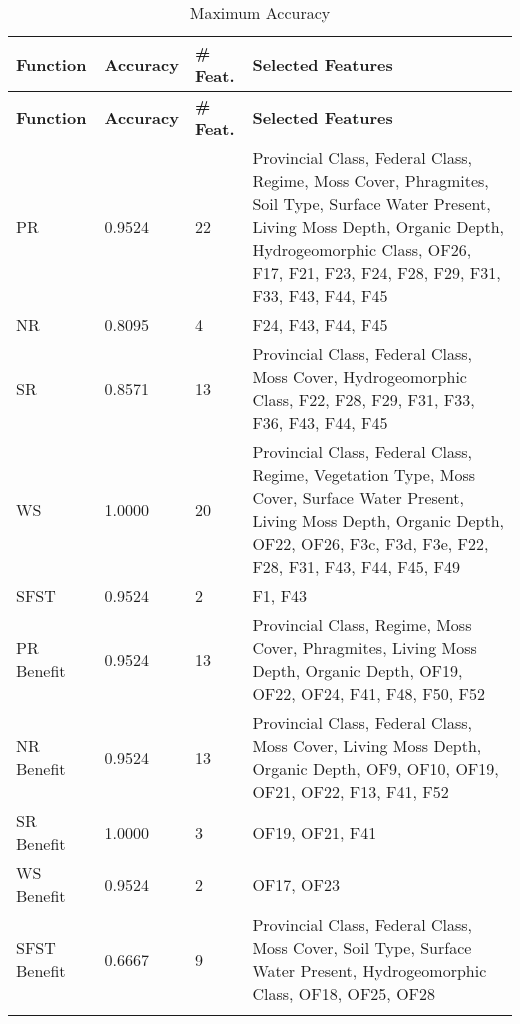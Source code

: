 \begin{longtable}{|p{2cm}|p{2cm}|p{2cm}|p{8cm}|}
\hline
\textbf{Function} & \textbf{Accuracy} & \textbf{\# Feat.} & \textbf{Selected Features} \\ \hline
\endfirsthead
\hline
\textbf{Function} & \textbf{Accuracy} & \textbf{\# Feat.} & \textbf{Selected Features} \\ \hline
\endhead

PR & 0.9524 & 22 & Provincial Class, Federal Class, Regime, Moss Cover, Phragmites, Soil Type, Surface Water Present, Living Moss Depth, Organic Depth, Hydrogeomorphic Class, OF26, F17, F21, F23, F24, F28, F29, F31, F33, F43, F44, F45 \\ \hline
NR & 0.8095 & 4 & F24, F43, F44, F45 \\ \hline
SR & 0.8571 & 13 & Provincial Class, Federal Class, Moss Cover, Hydrogeomorphic Class, F22, F28, F29, F31, F33, F36, F43, F44, F45 \\ \hline
WS & 1.0000 & 20 & Provincial Class, Federal Class, Regime, Vegetation Type, Moss Cover, Surface Water Present, Living Moss Depth, Organic Depth, OF22, OF26, F3c, F3d, F3e, F22, F28, F31, F43, F44, F45, F49 \\ \hline
SFST & 0.9524 & 2 & F1, F43 \\ \hline
PR Benefit & 0.9524 & 13 & Provincial Class, Regime, Moss Cover, Phragmites, Living Moss Depth, Organic Depth, OF19, OF22, OF24, F41, F48, F50, F52 \\ \hline
NR Benefit & 0.9524 & 13 & Provincial Class, Federal Class, Moss Cover, Living Moss Depth, Organic Depth, OF9, OF10, OF19, OF21, OF22, F13, F41, F52 \\ \hline
SR Benefit & 1.0000 & 3 & OF19, OF21, F41 \\ \hline
WS Benefit & 0.9524 & 2 & OF17, OF23 \\ \hline
SFST Benefit & 0.6667 & 9 & Provincial Class, Federal Class, Moss Cover, Soil Type, Surface Water Present, Hydrogeomorphic Class, OF18, OF25, OF28 \\ \hline

\caption{Maximum Accuracy}
\label{tab_class_specxtra:ensemble_class_acc}
\end{longtable}


